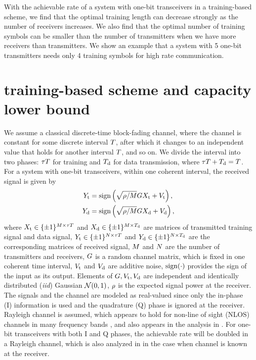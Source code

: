 \documentclass[conference]{IEEEtran}
\begin{document}
With the achievable rate of a system with one-bit transceivers in a training-based scheme, we find that the optimal training length can decrease strongly as the number of receivers increases. We also find that the optimal number of training symbols can be smaller than the number of transmitters when we have more receivers than transmitters. We show an example that a system with 5 one-bit transmitters needs only 4 training symbols for high rate communication.

\section{training-based scheme and capacity lower bound}
\label{sec:lower_bound}
We assume a classical discrete-time block-fading channel\cite{hassibi2003much}, where the channel is constant for some discrete interval $T$, after which it changes to an independent value that holds for another interval $T$, and so on. We divide the interval into two phases: ${\tau T}$ for training and $T_{\rm d}$ for data transmission, where ${\tau T}+T_{\rm d}=T$. For a system with one-bit transceivers, within one coherent interval, the received signal is given by
\begin{subequations}
\begin{align}
    Y_{\rm t} &= \text{sign}\left(\sqrt{\rho/M}GX_{\rm t}+V_{\rm t}\right),
    \label{eq:training_phase} \\
    Y_{\rm d} &= \text{sign}\left(\sqrt{\rho/M}GX_{\rm d}+V_{\rm d}\right),
    \label{eq:data_phase}
\end{align}
\label{eq:training_data_model}
\end{subequations}
where $X_{\rm t}\in\{\pm1\}^{M\times{\tau T}}$ and $X_{\rm d}\in\{\pm1\}^{M\times T_{\rm d}}$ are matrices of  transmitted training signal and data signal, $Y_{\rm t}\in\{\pm1\}^{N\times{\tau T}}$ and $Y_{\rm d}\in\{\pm1\}^{N\times T_{\rm d}}$ are the corresponding matrices of received signal, $M$ and $N$ are the number of transmitters and receivers, $G$ is a random channel matrix, which is fixed in one coherent time interval, $V_{\rm t}$ and $V_{\rm d}$ are additive noise, $\text{sign}(\cdot)$ provides the sign of the input as its output. Elements of $G,V_{\rm t},V_{\rm d}$ are independent and identically distributed ({\it iid}) Gaussian $\mathcal{N}(0,1)$, $\rho$ is the expected signal power at the receiver. The signals and the channel are modeled as real-valued since only the in-phase (I) information is used and the quadrature (Q) phase is ignored at the receiver. Rayleigh channel is assumed, which appears to hold for non-line of sight (NLOS) channels in many frequency bands \cite{rappaport2014millimeter}, and also appears in the analysis in \cite{ mollen2016one,mollen2017uplink,choi2016near,li2016channel,saxena2017analysis}. For one-bit transceivers with both I and Q phases, the achievable rate will be doubled in a Rayleigh channel, which is also analyzed in \cite{gao2018capacity} in the case when channel is known at the receiver. 
\end{document}
